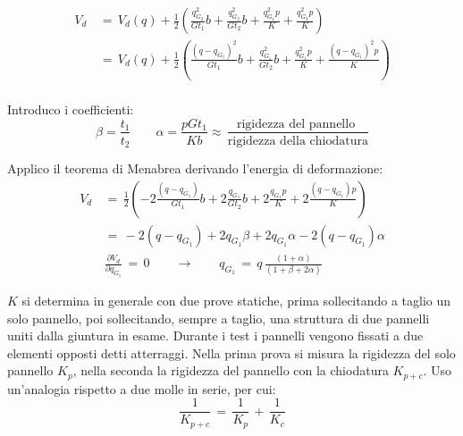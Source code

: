 \begin{align*}
    V_{d}\,&=\,V_d(q) +\frac{1}{2} \left( \frac{q_{G_2}^2}{Gt_1}  b  +\frac{q_{G_2}^2}{Gt_2}  b  +\frac{q_{G_1}^2p}{K} +\frac{q_{G_2}^2p}{K}     \right)\\
    &=\,V_d(q) +\frac{1}{2} \left( \frac{(q-q_{G_1})^2}{Gt_1}  b  +\frac{q_{G_1}^2}{Gt_2}  b  +\frac{q_{G_1}^2p}{K} +\frac{(q-q_{G_1})^2p}{K}     \right)\\
\end{align*}

Introduco i coefficienti:
\begin{equation*}
    \beta=\frac{t_1}{t_2} \qquad\alpha=\frac{pGt_1}{Kb}\approx\,\frac{\text{rigidezza del pannello }}{\text{rigidezza della chiodatura}}
\end{equation*}

Applico il teorema di Menabrea derivando l'energia di deformazione:
\begin{align*}
    V_{d}\,&=\,\frac{1}{2} \left( -2\frac{(q-q_{G_1})}{Gt_1}  b  +2\frac{q_{G_1}}{Gt_2}  b  +2\frac{q_{G_1}p}{K} +2\frac{(q-q_{G_1})p}{K}     \right)\\
    &=\,  -2(q-q_{G_1}) + 2q_{G_1}\beta    + 2q_{G_1}\alpha    -2(q-q_{G_1})\alpha\\
   & \frac{\partial V_d}{\partial q_{G_1}}\,=\,0  \qquad\rightarrow\qquad q_{G_1} \,=\,q\,\frac{(1+\alpha)}{(1+\beta+2\alpha)}  
\end{align*}



$K$ si determina in generale con due prove statiche, prima sollecitando a taglio un solo pannello, poi sollecitando, sempre a taglio, una struttura di due pannelli uniti dalla giuntura in esame. Durante i test i pannelli vengono fissati a due elementi opposti detti atterraggi. Nella prima prova si misura la rigidezza del solo pannello $K_p$, nella seconda la rigidezza del pannello con la chiodatura $K_{p+c}$. Uso un'analogia rispetto a due molle in serie, per cui:
\begin{equation*}
    \frac{1}{K_{p+c}}\,=\, \frac{1}{K_{p}}  \,+\,\frac{1}{K_{c}}
\end{equation*}







